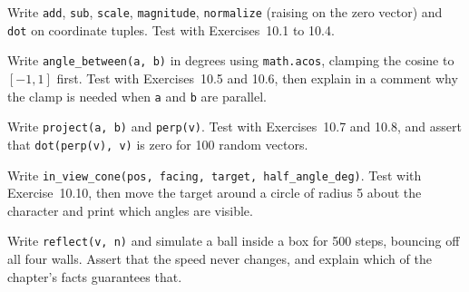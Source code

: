 \begin{codeexercises}
\item Write \lstinline!add!, \lstinline!sub!, \lstinline!scale!, \lstinline!magnitude!, \lstinline!normalize! (raising on the zero vector) and \lstinline!dot! on coordinate tuples. Test with Exercises~10.1 to 10.4.
\item Write \lstinline!angle_between(a, b)! in degrees using \lstinline!math.acos!, clamping the cosine to $[-1, 1]$ first. Test with Exercises~10.5 and 10.6, then explain in a comment why the clamp is needed when \lstinline!a! and \lstinline!b! are parallel.
\item Write \lstinline!project(a, b)! and \lstinline!perp(v)!. Test with Exercises~10.7 and 10.8, and assert that \lstinline!dot(perp(v), v)! is zero for 100 random vectors.
\item Write \lstinline!in_view_cone(pos, facing, target, half_angle_deg)!. Test with Exercise~10.10, then move the target around a circle of radius 5 about the character and print which angles are visible.
\item Write \lstinline!reflect(v, n)! and simulate a ball inside a box for 500 steps, bouncing off all four walls. Assert that the speed never changes, and explain which of the chapter's facts guarantees that.
\end{codeexercises}
